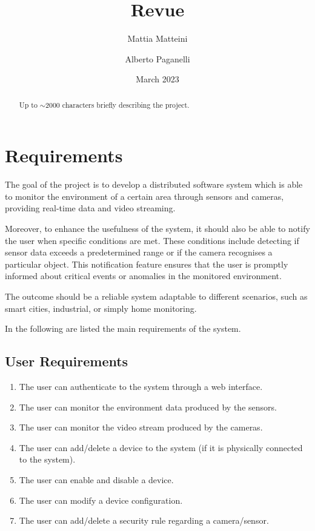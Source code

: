 \documentclass{scrartcl}
\title{
    Revue
}
\author{
    Mattia Matteini \\ \emailaddr{mattia.matteini@studio.unibo.it}
    \and
    Alberto Paganelli \\ \emailaddr{alberto.paganelli3@studio.unibo.it}
}
\date{March 2023}
\begin{document}
    \maketitle

    \begin{abstract}
        Up to $\sim$2000 characters briefly describing the project.
    \end{abstract}


    \section{Requirements}

    The goal of the project is to develop a distributed software system which is able to monitor the environment
    of a certain area through sensors and cameras, providing real-time data and video streaming.

    Moreover, to enhance the usefulness of the system, it should also be able to notify the user when specific
    conditions are met.
    These conditions include detecting if sensor data exceeds a predetermined range or if the camera
    recognises a particular object.
    This notification feature ensures that the user is promptly informed about critical
    events or anomalies in the monitored environment.

    The outcome should be a reliable system adaptable to different scenarios, such as smart cities, industrial, or
    simply home monitoring.

    In the following are listed the main requirements of the system.

    \subsection{User Requirements}\label{subsec:user-requirements}

    \begin{enumerate}
        \item \label{itm:user-1} The user can authenticate to the system through a web interface.
        \item \label{itm:user-2} The user can monitor the environment data produced by the sensors.
        \item \label{itm:user-3} The user can monitor the video stream produced by the cameras.
        \item \label{itm:user-4} The user can add/delete a device to the system (if it is physically connected to the system).
        \item \label{itm:user-5} The user can enable and disable a device.
        \item \label{itm:user-6} The user can modify a device configuration.
        \item \label{itm:user-7} The user can add/delete a security rule regarding a camera/sensor.
    \end{enumerate}
\end{document}
